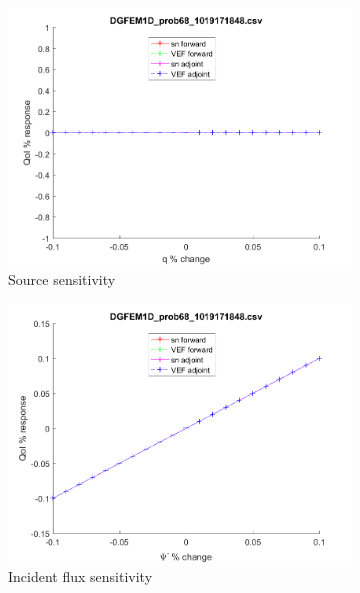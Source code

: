 \documentclass{article}
\begin{document}
\begin{figure}[H]
\label{Case68Sens}
\centering
\begin{subfigure}{.5\textwidth}
  \centering
  \includegraphics[width=.98\linewidth]{IanProposal/figures2/68qSens.png}
  \caption{Source sensitivity}
  \label{fig:sfig1}
\end{subfigure}%
\begin{subfigure}{.5\textwidth}
  \centering
  \includegraphics[width=.98\linewidth]{IanProposal/figures2/68incSens.png}
  \caption{Incident flux sensitivity}
  \label{fig:sfig4}
\end{subfigure}%
\\
\begin{subfigure}{.5\textwidth}
  \centering

\end{subfigure}
\end{figure}
\end{document}
